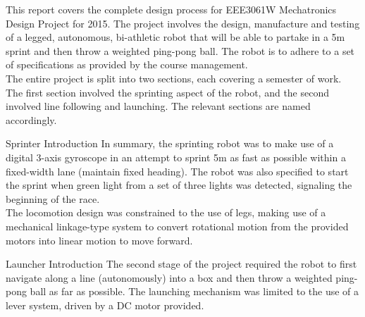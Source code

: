 \begin{homeworkProblem}[{Introduction}]
This report covers the complete design process for EEE3061W Mechatronics Design Project for 2015.  The project involves the design, manufacture and testing of a legged, autonomous, bi-athletic robot that will be able to partake in a 5m sprint and then throw a weighted ping-pong ball.  The robot is to adhere to a set of specifications as provided by the course management. \\

The entire project is split into two sections, each covering a semester of work.  The first section involved the sprinting aspect of the robot, and the second involved line following and launching.  The relevant sections are named accordingly. \\

\begin{homeworkSection}{Sprinter Introduction}
In summary, the sprinting robot was to make use of a digital 3-axis gyroscope in an attempt to sprint 5m as fast as possible within a fixed-width lane (maintain fixed heading).  The robot was also specified to start the sprint when green light from a set of three lights was detected, signaling the beginning of the race. \\

The locomotion design was constrained to the use of legs, making use of a mechanical linkage-type system to convert rotational motion from the provided motors into linear motion to move forward.

\end{homeworkSection}

\begin{homeworkSection}{Launcher Introduction}
The second stage of the project required the robot to first navigate along a line (autonomously) into a box and then throw a weighted ping-pong ball as far as possible. The launching mechanism was limited to the use of a lever system, driven by a DC motor provided.

\end{homeworkSection}
\end{homeworkProblem}

